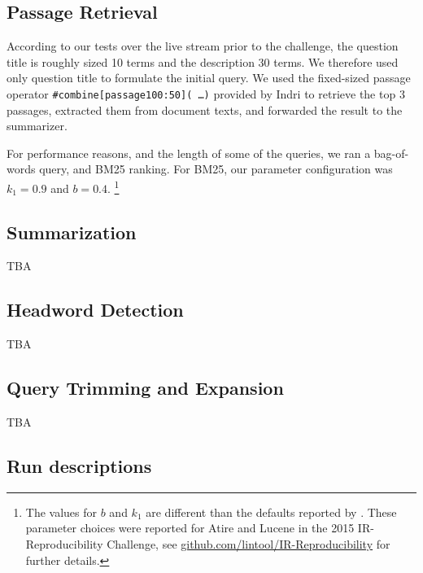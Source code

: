 \documentclass[a4paper,10pt,conference,compsocconf,final]{IEEEtran}
\begin{document}
\subsection{Passage Retrieval}
\label{sec:passage}

According to our tests over the live stream prior to the challenge, the
question title is roughly sized 10 terms and the description 30 terms.  We
therefore used only question title to formulate the initial query.  We used the
fixed-sized passage operator \texttt{\#combine[passage100:50]( \ldots)}
provided by Indri to retrieve the top 3 passages, extracted them from document
texts, and forwarded the result to the summarizer.

For performance reasons, and the length of some of the queries, we ran a
bag-of-words query, and BM25 ranking.  For BM25, our parameter configuration
was $k_1=0.9$ and $b=0.4$.  \footnote{The values for $b$ and $k_1$ are
different than the defaults reported by {\citet{rwj+94-trec}}.  These parameter
choices were reported for Atire and Lucene in the 2015 IR-Reproducibility
Challenge, see {\url{github.com/lintool/IR-Reproducibility}} for further
details.}  

\subsection{Summarization}
\label{sec:sum}

TBA

\subsection{Headword Detection}
\label{sec:head}

TBA

\subsection{Query Trimming and Expansion}
\label{sec:redexp}

TBA

\subsection{Run descriptions}
\end{document}

